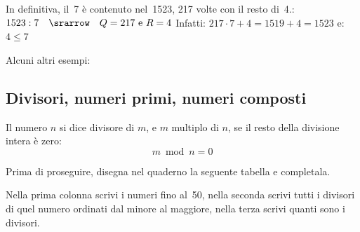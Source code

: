 In definitiva, il~7 è contenuto nel~1523, 217 volte con il resto di~4.:\\
\(1523:7 \quad \srarrow \quad Q=217 \text{ e } R=4\) \quad
Infatti: \(217 \cdot 7 + 4 = 1519 + 4 = 1523\)
e: \(4 \leqslant 7\)

\vspace{.5em}
Alcuni altri esempi:

\vspace{-6pt}
\begin{center}
\begin{inaccessibleblock}
\divintb
%  
\end{inaccessibleblock}
\end{center}
\vspace{-12pt}


\subsection{Divisori, numeri primi, numeri composti}


\begin{definizione}{}{}
Il numero \(n\) si dice divisore di \(m\), e \(m\) multiplo di \(n\),
se il resto della divisione intera è zero: 
\[m \bmod n = 0\]
\end{definizione}

Prima di proseguire, disegna nel quaderno la seguente tabella e completala. 

Nella prima colonna scrivi i numeri fino al~50, nella seconda scrivi tutti 
i divisori di quel numero ordinati dal minore al maggiore, nella terza 
scrivi quanti sono i divisori.

